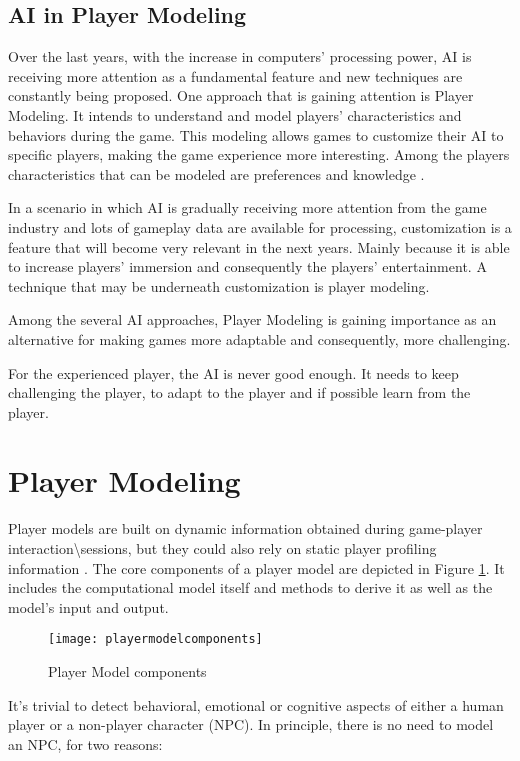 \subsection{AI in Player Modeling}
Over the last years, with the increase in computers’ processing power, AI is receiving more attention as a fundamental feature and new techniques are constantly being proposed. One approach that is gaining attention is Player Modeling. It intends to understand and model players’ characteristics and behaviors during the game. This modeling allows games to customize their AI to specific players, making the game experience more interesting. Among the players characteristics that can be modeled are preferences and knowledge \citep{MachadoPlayermodelingcommon2011}.

In a scenario in which AI is gradually receiving more attention from the game industry and lots of gameplay data are available for processing, customization is a feature that will become very relevant in the next years. Mainly because it is able to increase players' immersion and consequently the players' entertainment. A technique that may be underneath customization is player modeling.

Among the several AI approaches, Player Modeling is gaining importance as an alternative for making games more adaptable and consequently, more challenging.

For the experienced player, the AI is never good enough. It needs to keep challenging the player, to adapt to the player and if possible learn from the player.

\section{Player Modeling}
Player models are built on dynamic information obtained during game-player interaction\textbackslash{}sessions, but they could also rely on static player profiling information \citep{YannakakisPlayerModeling2013}.
The core components of a player model are depicted in Figure \ref{fig:pmc}. It includes the computational model itself and methods to derive it as well as the model’s input and output.

\begin{figure}
	\centering
	\texttt{[image: playermodelcomponents]}
	\caption{Player Model components}
	\label{fig:pmc}
\end{figure}

It’s trivial to detect behavioral, emotional or cognitive aspects of either a human player or a non-player character (NPC).
In principle, there is no need to model an NPC, for two reasons:

